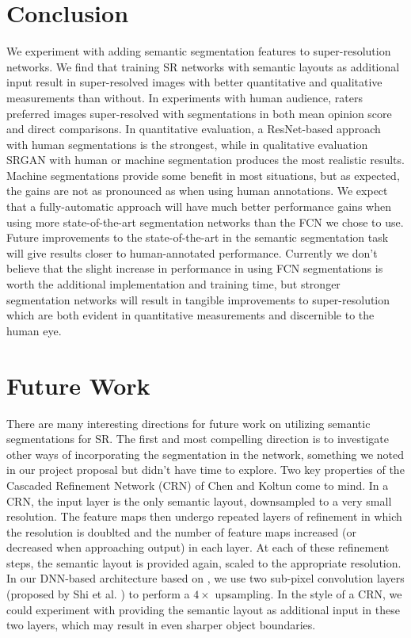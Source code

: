 \documentclass[10pt,twocolumn,letterpaper]{article}
\begin{document}

\section{Conclusion}
\label{sec:conclusion}
We experiment with adding semantic segmentation features to super-resolution
networks. We find that training SR networks with semantic layouts as additional
input result in super-resolved images with better quantitative and qualitative
measurements than without. In experiments with human audience, raters preferred
images super-resolved with segmentations in both mean opinion score and direct
comparisons. In quantitative evaluation, a ResNet-based approach with human
segmentations is the strongest, while in qualitative evaluation SRGAN with
human or machine segmentation produces the most realistic results. Machine
segmentations provide some benefit in most situations, but as expected, the
gains are not as pronounced as when using human annotations. We expect that a
fully-automatic approach will have much better performance gains when using
more state-of-the-art segmentation networks than the FCN we chose to use.
Future improvements to the state-of-the-art in the semantic segmentation task
will give results closer to human-annotated performance. Currently we don't
believe that the slight increase in performance in using FCN segmentations is
worth the additional implementation and training time, but stronger
segmentation networks will result in tangible improvements to super-resolution
which are both evident in quantitative measurements and discernible to the
human eye.


\section{Future Work}
There are many interesting directions for future work on utilizing semantic
segmentations for SR. The first and most compelling direction is to investigate
other ways of incorporating the segmentation in the network, something we noted
in our project proposal but didn't have time to explore. Two key properties of
the Cascaded Refinement Network (CRN) of Chen and Koltun \cite{ImageSynthesis}
come to mind. In a CRN, the input layer is the only semantic layout,
downsampled to a very small resolution. The feature maps then undergo repeated
layers of refinement in which the resolution is doublted and the number of
feature maps increased (or decreased when approaching output) in each layer. At
each of these refinement steps, the semantic layout is provided again, scaled
to the appropriate resolution. In our DNN-based architecture based on
\cite{SRGAN}, we use two sub-pixel convolution layers (proposed by Shi et al.
\cite{SubPixelConv}) to perform a $4 \times$ upsampling. In the style of a CRN,
we could experiment with providing the semantic layout as additional input in
these two layers, which may result in even sharper object boundaries.
\end{document}
